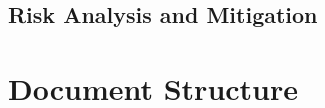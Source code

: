 \subsection{Risk Analysis and Mitigation}
\label{subsec:intro-risks}


\section{Document Structure}
\label{sec:intro-structure}


